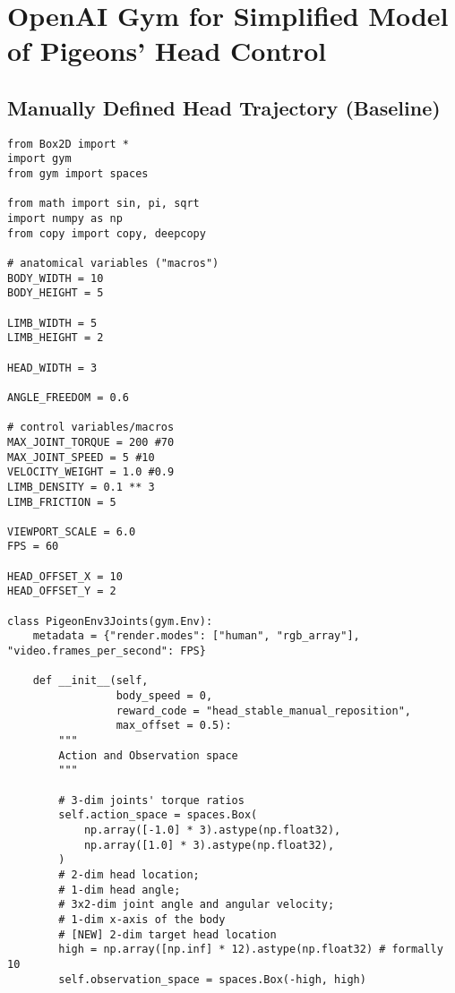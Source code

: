 \section{OpenAI Gym for Simplified Model of Pigeons' Head Control}



\subsection{Manually Defined Head Trajectory (Baseline)}
\begin{lstlisting}
from Box2D import *
import gym
from gym import spaces

from math import sin, pi, sqrt
import numpy as np
from copy import copy, deepcopy

# anatomical variables ("macros")
BODY_WIDTH = 10
BODY_HEIGHT = 5

LIMB_WIDTH = 5
LIMB_HEIGHT = 2

HEAD_WIDTH = 3

ANGLE_FREEDOM = 0.6

# control variables/macros
MAX_JOINT_TORQUE = 200 #70
MAX_JOINT_SPEED = 5 #10
VELOCITY_WEIGHT = 1.0 #0.9
LIMB_DENSITY = 0.1 ** 3
LIMB_FRICTION = 5

VIEWPORT_SCALE = 6.0
FPS = 60

HEAD_OFFSET_X = 10
HEAD_OFFSET_Y = 2

class PigeonEnv3Joints(gym.Env):
    metadata = {"render.modes": ["human", "rgb_array"], "video.frames_per_second": FPS}

    def __init__(self,
                 body_speed = 0,
                 reward_code = "head_stable_manual_reposition",
                 max_offset = 0.5):
        """
        Action and Observation space
        """

        # 3-dim joints' torque ratios
        self.action_space = spaces.Box(
            np.array([-1.0] * 3).astype(np.float32),
            np.array([1.0] * 3).astype(np.float32),
        )
        # 2-dim head location;
        # 1-dim head angle;
        # 3x2-dim joint angle and angular velocity;
        # 1-dim x-axis of the body
        # [NEW] 2-dim target head location
        high = np.array([np.inf] * 12).astype(np.float32) # formally 10
        self.observation_space = spaces.Box(-high, high)


\end{lstlisting}
